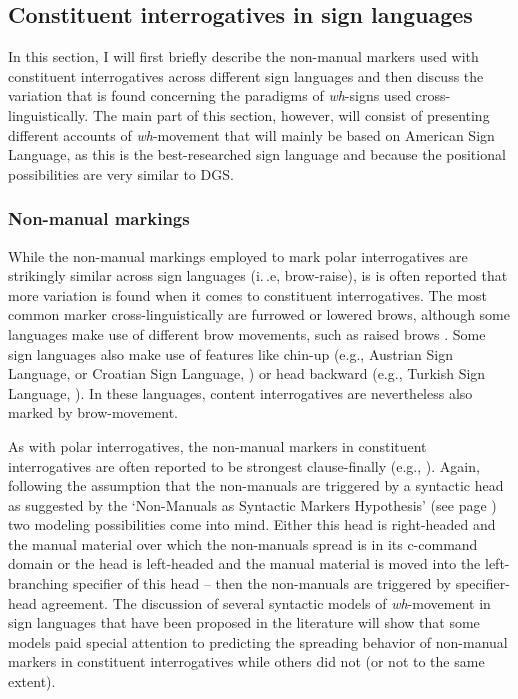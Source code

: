 \subsection{Constituent interrogatives in sign languages}\label{whsigned}
In this section, I will first briefly describe the non-manual markers used with constituent interrogatives across different sign languages and then discuss the variation that is found concerning the paradigms of \textit{wh}-signs used cross-linguistically. The main part of this section, however, will consist of presenting different accounts of \textit{wh}-movement that will mainly be based on American Sign Language, as this is the best-researched sign language and because the positional possibilities are very similar to  DGS. %

\largerpage[-1]
\subsubsection{Non-manual markings}
While the non-manual markings employed to mark polar interrogatives are strikingly similar across sign languages (i.\,.e, brow-raise), is is often reported that more variation is found when it comes to constituent interrogatives. The most common marker cross-linguistically are furrowed or lowered brows, although some languages make use of different brow movements, such as raised brows \citep{zeshan2004interrogative}. Some sign languages also make use of features like chin-up (e.g., Austrian Sign Language, \citealt{sarac2007cross} or Croatian Sign Language, \citealt{sarac2006interrogative}) or head backward (e.g., Turkish Sign Language, \citealt{goksel2013phonological}). In these languages, content interrogatives are nevertheless also marked by brow-movement.

As with polar interrogatives, the non-manual markers in constituent interrogatives are often reported to be strongest clause-finally (e.g., \citealt{sandler2006sign}). Again, following the assumption that the non-manuals are triggered by a syntactic head as suggested by the `Non-Manuals as Syntactic Markers Hypothesis' (see page \pageref{nmasmh}) two modeling possibilities come into mind. Either this head is right-headed and the manual material over which the non-manuals spread is in its c-command domain or the head is left-headed and the manual material is moved into the left-branching specifier of this head -- then the non-manuals are triggered by specifier-head agreement. The discussion of several syntactic models of \textit{wh}-movement in sign languages that have been proposed in the literature will show that some models paid special attention to predicting the spreading behavior of non-manual markers in constituent interrogatives while others did not (or not to the same extent).


